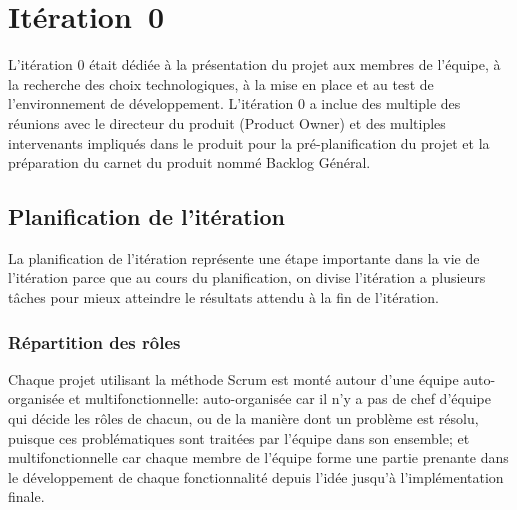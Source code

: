\chapter{Itération~0}
\label{sec:sprint0}


L'itération 0 était dédiée à la présentation du projet aux membres de l'équipe,
à la recherche des choix technologiques, à la mise en place et au test de
l'environnement de développement. L'itération 0 a inclue des multiple des
réunions avec le directeur du produit (Product Owner) et des multiples
intervenants impliqués dans le produit pour la pré-planification du projet et
la préparation du carnet du produit nommé Backlog Général.


\section{Planification de l'itération}

La planification de l'itération représente une étape importante dans la vie de
l'itération parce que au cours du planification, on divise l'itération a
plusieurs tâches pour mieux atteindre le résultats attendu à la fin de
l'itération.

\subsection{Répartition des rôles}

Chaque projet utilisant la méthode Scrum est monté autour d'une équipe
auto-organisée et multifonctionnelle: auto-organisée car il n'y a pas de chef
d'équipe qui décide les rôles de chacun, ou de la manière dont un problème est
résolu, puisque ces problématiques sont traitées par l'équipe dans son
ensemble; et multifonctionnelle car chaque membre de l'équipe forme une partie
prenante dans le développement de chaque fonctionnalité depuis l'idée jusqu'à
l'implémentation finale.

